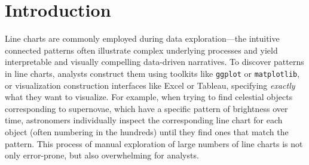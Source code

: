 \vspace{-5pt}
\section{Introduction\label{sec:intro}}
Line charts are commonly employed during data exploration---the
intuitive connected patterns
often illustrate complex underlying processes
and yield interpretable and visually compelling data-driven
narratives.
To discover patterns in line charts,
analysts construct them
using toolkits like \texttt{ggplot} or \texttt{matplotlib},
or visualization construction interfaces
like Excel or Tableau, specifying
{\em exactly} what they want to visualize.
For example, when trying to find celestial objects
corresponding to supernovae, which have a specific pattern
of brightness over time, astronomers
individually inspect the corresponding line chart
for each object (often numbering in the hundreds)
until they find ones that match the pattern. 
This process of manual exploration of
large numbers of line charts
is not only error-prone, but also overwhelming for
analysts.

